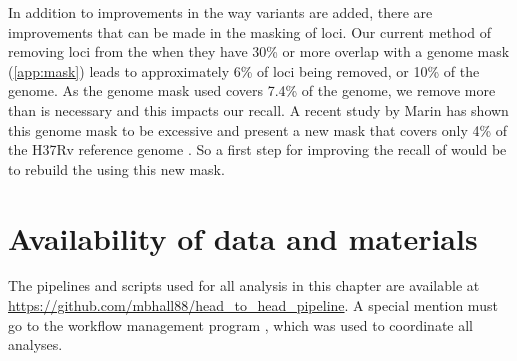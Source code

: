 In addition to improvements in the way variants are added, there are improvements that can be made in the masking of loci. Our current method of removing loci from the \prg{} when they have 30\% or more overlap with a genome mask (\autoref{app:mask}) leads to approximately 6\% of loci being removed, or 10\% of the genome. As the genome mask used covers 7.4\% of the genome, we remove more than is necessary and this impacts our recall. A recent study by Marin \etal{} has shown this genome mask to be excessive and present a new mask that covers only 4\% of the H37Rv reference genome \cite{marin2021}. So a first step for improving the recall of \pandora{} would be to rebuild the \prg{} using this new mask.


\section{Availability of data and materials}

The pipelines and scripts used for all analysis in this chapter are available at \url{https://github.com/mbhall88/head_to_head_pipeline}. A special mention must go to the workflow management program  \cite{snakemake2021}, which was used to coordinate all analyses.

